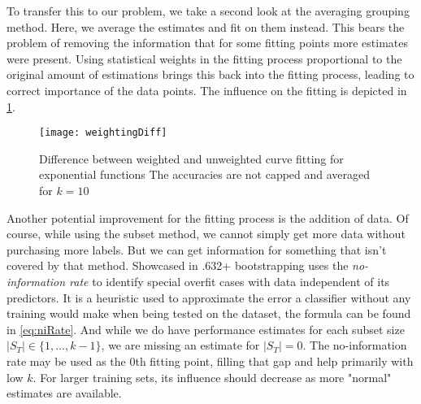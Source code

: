 To transfer this to our problem, we take a second look at the averaging grouping method. Here, we average the estimates and fit on them instead. This bears the problem of removing the information that for some fitting points more estimates were present. Using statistical weights in the fitting process proportional to the original amount of estimations brings this back into the fitting process, leading to correct importance of the data points. The influence on the fitting is depicted in \ref{fig:weigthingExample}.

\begin{figure}[h]
	\centering
	\texttt{[image: weightingDiff]}
	\caption{Difference between weighted and unweighted curve fitting for exponential functions The accuracies are not capped and averaged for $k = 10$}
	\label{fig:weigthingExample}
\end{figure}

Another potential improvement for the fitting process is the addition of data. Of course, while using the subset method, we cannot simply get more data without purchasing more labels. But we can get information for something that isn't covered by that method. Showcased in \cite{EfronEtAl1997} .632+ bootstrapping uses the \textit{no-information rate} to identify special overfit cases with data independent of its predictors. It is a heuristic used to approximate the error a classifier without any training would make when being tested on the dataset, the formula can be found in \eqref{eq:niRate}. And while we do have performance estimates for each subset size $|S_T| \in \{1, ..., k-1\}$, we are missing an estimate for $|S_T| = 0$. The no-information rate may be used as the 0th fitting point, filling that gap and help primarily with low $k$. For larger training sets, its influence should decrease as more "normal" estimates are available.

